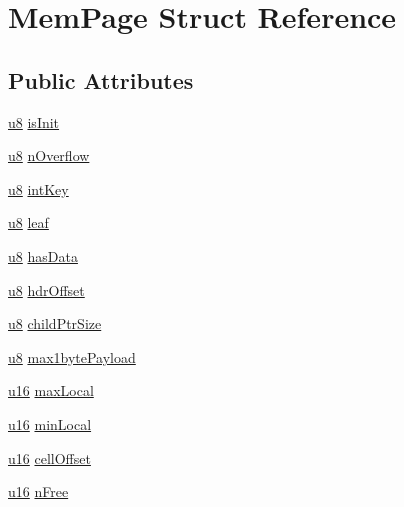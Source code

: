 \hypertarget{struct_mem_page}{\section{Mem\-Page Struct Reference}
\label{struct_mem_page}
}
\subsection*{Public Attributes}
\begin{DoxyCompactItemize}
\item 
\hyperlink{sqlite3_8c_a74a0f6424ae628af25f23f0a35f6ead3}{u8} \hyperlink{struct_mem_page_a3ab4ace46245be0fb2fb19eaa2862019}{is\-Init}
\item 
\hyperlink{sqlite3_8c_a74a0f6424ae628af25f23f0a35f6ead3}{u8} \hyperlink{struct_mem_page_a3f7fa1a1eba3af840ef887e8ddd6d2cc}{n\-Overflow}
\item 
\hyperlink{sqlite3_8c_a74a0f6424ae628af25f23f0a35f6ead3}{u8} \hyperlink{struct_mem_page_a46784c3c4708c7a582cff81a29c55323}{int\-Key}
\item 
\hyperlink{sqlite3_8c_a74a0f6424ae628af25f23f0a35f6ead3}{u8} \hyperlink{struct_mem_page_af18504bd0a2e7d39d9b485d434af0447}{leaf}
\item 
\hyperlink{sqlite3_8c_a74a0f6424ae628af25f23f0a35f6ead3}{u8} \hyperlink{struct_mem_page_af7b608d25c2e326f82cc270cd53dd8f8}{has\-Data}
\item 
\hyperlink{sqlite3_8c_a74a0f6424ae628af25f23f0a35f6ead3}{u8} \hyperlink{struct_mem_page_a01967a1a593980fb71c8ccf3393ae156}{hdr\-Offset}
\item 
\hyperlink{sqlite3_8c_a74a0f6424ae628af25f23f0a35f6ead3}{u8} \hyperlink{struct_mem_page_aeba10281fc255d9bbc0e31486f8fbd48}{child\-Ptr\-Size}
\item 
\hyperlink{sqlite3_8c_a74a0f6424ae628af25f23f0a35f6ead3}{u8} \hyperlink{struct_mem_page_a79548547cafb0e6d8549006bdc553f0a}{max1byte\-Payload}
\item 
\hyperlink{sqlite3_8c_a20f2299e322dcbde37cb07b16910b843}{u16} \hyperlink{struct_mem_page_a36394b7c3abf4652e7a24be4ab314f13}{max\-Local}
\item 
\hyperlink{sqlite3_8c_a20f2299e322dcbde37cb07b16910b843}{u16} \hyperlink{struct_mem_page_a95cab31aa57bf8b478be273557c5c807}{min\-Local}
\item 
\hyperlink{sqlite3_8c_a20f2299e322dcbde37cb07b16910b843}{u16} \hyperlink{struct_mem_page_a324ed834d93c3ae72994fb5730940521}{cell\-Offset}
\item 
\hyperlink{sqlite3_8c_a20f2299e322dcbde37cb07b16910b843}{u16} \hyperlink{struct_mem_page_a3418a9aee707f57a73d8470f8a1228a8}{n\-Free}

\end{DoxyCompactItemize}
